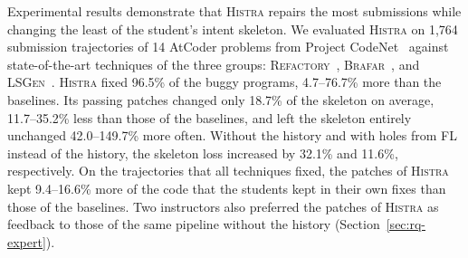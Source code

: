 \documentclass[10pt,conference]{IEEEtran}
\begin{document}
Experimental results demonstrate that \textsc{Histra} repairs the most submissions while changing the least of the student's intent skeleton. We evaluated \textsc{Histra} on 1,764 submission trajectories of 14 AtCoder problems from Project CodeNet~\cite{puri2021codenet} against state-of-the-art techniques of the three groups: \textsc{Refactory}~\cite{hu2019re}, \textsc{Brafar}~\cite{xie2024brafar}, and \textsc{LSGen}~\cite{dai2026learner}. \textsc{Histra} fixed 96.5\% of the buggy programs, 4.7--76.7\% more than the baselines. Its passing patches changed only 18.7\% of the skeleton on average, 11.7--35.2\% less than those of the baselines, and left the skeleton entirely unchanged 42.0--149.7\% more often. Without the history and with holes from FL instead of the history, the skeleton loss increased by 32.1\% and 11.6\%, respectively. On the trajectories that all techniques fixed, the patches of \textsc{Histra} kept 9.4--16.6\% more of the code that the students kept in their own fixes than those of the baselines. Two instructors also preferred the patches of \textsc{Histra} as feedback to those of the same pipeline without the history (Section~\ref{sec:rq-expert}).
\end{document}

